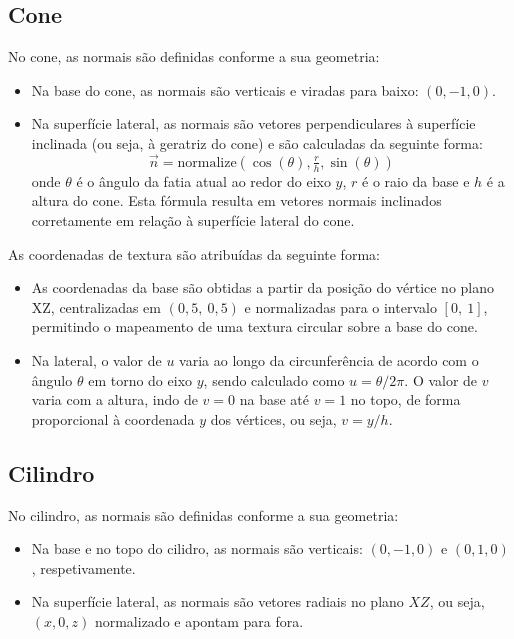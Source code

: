 \documentclass[12pt, a4paper]{article}
\begin{document}
\subsection{Cone}

No cone, as normais são definidas conforme a sua geometria:

\begin{itemize}
    \item Na base do cone, as normais são verticais e viradas para baixo: $(0, -1, 0)$.
    \item Na superfície lateral, as normais são vetores perpendiculares à superfície
    inclinada (ou seja, à geratriz do cone) e são calculadas da seguinte forma:
\[
\vec{n} = \text{normalize}(\cos(\theta), \tfrac{r}{h}, \sin(\theta))
\]
onde \( \theta \) é o ângulo da fatia atual ao redor do eixo \( y \), \( r \) é o raio da
base e \( h \) é a altura do cone.
Esta fórmula resulta em vetores normais inclinados corretamente em relação à superfície
lateral do cone.
\end{itemize}

As coordenadas de textura são atribuídas da seguinte forma:

\begin{itemize}
    \item As coordenadas da base são obtidas a partir da posição do vértice no plano XZ,
    centralizadas em $(0{,}5,\ 0{,}5)$ e normalizadas para o intervalo $[0,\ 1]$,
    permitindo o mapeamento de uma textura circular sobre a base do cone.
    \item Na lateral, o valor de $u$ varia ao longo da circunferência de acordo com o ângulo
    $\theta$ em torno do eixo $y$, sendo calculado como $u = \theta / 2\pi$. O valor de $v$
    varia com a altura, indo de $v = 0$ na base até $v = 1$ no topo, de forma proporcional à
    coordenada $y$ dos vértices, ou seja, $v = y/h$.
\end{itemize}

\subsection{Cilindro}

No cilindro, as normais são definidas conforme a sua geometria:

\begin{itemize}
    \item Na base e no topo do cilidro, as normais são verticais: $(0, -1, 0)$ e $(0, 1, 0)$,
    respetivamente.
    \item Na superfície lateral, as normais são vetores radiais no plano $XZ$, ou seja, $(x, 0, z)$
    normalizado e apontam para fora.
\end{itemize}
\end{document}
